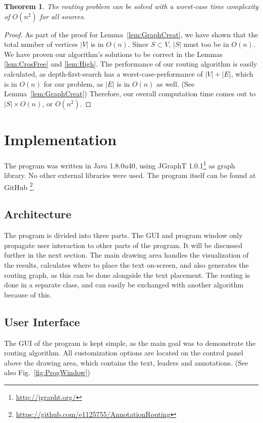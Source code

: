 \documentclass[11pt,a4paper]{vutinfth}
\newtheorem{theorem}{Theorem}
\begin{document}
\begin{theorem}
	The routing problem can be solved with a worst-case time complexity of $O(n^2)$ for all sources.
\end{theorem}
\begin{proof}
	As part of the proof for Lemma~\ref*{lem:GraphCreat}, we have shown that the total number of vertices $|V|$ is in $O(n)$. Since $S \subset V$, $|S|$ must too be in $O(n)$. 
	We have proven our algorithm's solutions to be correct in the Lemmas \ref*{lem:CrosFree} and \ref*{lem:High}.
	The performance of our routing algorithm is easily calculated, as depth-first-search has a worst-case-performance of $|V|+|E|$, which is in $O(n)$ for our problem, as $|E|$ is in $O(n)$ as well. (See Lemma~\ref*{lem:GraphCreat})
	Therefore, our overall computation time comes out to $|S| \times O(n)$, or $O(n^2)$.
\end{proof}


\chapter{Implementation}
The program was written in Java 1.8.0u40, using JGraphT 1.0.1\footnote{\url{http://jgrapht.org/}} as graph library. No other external libraries were used.
The program itself can be found at GitHub \footnote{\url{https://github.com/e1125755/AnnotationRouting}}.

\section{Architecture}
The program is divided into three parts. The GUI and program window only propagate user interaction to other parts of the program. It will be discussed further in the next section.
The main drawing area handles the visualization of the results, calculates where to place the text on-screen, and also generates the routing graph, as this can be done alongside the text placement.
The routing is done in a separate class, and can easily be exchanged with another algorithm because of this.

\section{User Interface}
\label{sec:UI}
The GUI of the program is kept simple, as the main goal was to demonstrate the routing algorithm. All customization options are located on the control panel above the drawing area, which contains the text, leaders and annotations. (See also Fig.~\ref*{fig:ProgWindow})
\end{document}
